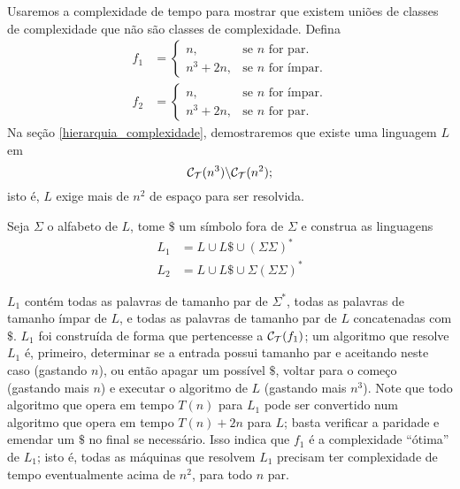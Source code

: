 \begin{counterexample}
    Usaremos a complexidade de tempo para mostrar que
    existem uniões de classes de complexidade
    que não são classes de complexidade.
    Defina
    \begin{align*}
        f_1 & = \begin{cases}
                    n, & \text{se $n$ for par.} \\
                    n^3 + 2n, & \text{se $n$ for ímpar.}
                \end{cases} \\
        f_2 & = \begin{cases}
                    n, & \text{se $n$ for ímpar.} \\
                    n^3 + 2n, & \text{se $n$ for par.}
                \end{cases}
    \end{align*}
    Na seção \ref{hierarquia_complexidade},
    demostraremos que existe uma linguagem $L$ em
    \begin{equation*}
        \mathcal C_{\mathcal{T}}(n^3) \backslash \mathcal C_{\mathcal{T}}(n^2);
    \end{equation*}
    isto é, $L$ exige mais de $n^2$ de espaço para ser resolvida.

    Seja $\Sigma$ o alfabeto de $L$,
    tome $\$$ um símbolo fora de $\Sigma$
    e construa as linguagens
    \begin{align*}
        L_1 &= L \cup L\$ \cup ( \Sigma \Sigma )^* \\
        L_2 &= L \cup L\$ \cup \Sigma ( \Sigma \Sigma )^*
    \end{align*}

    $L_1$ contém todas as palavras de tamanho par de $\Sigma^*$,
    todas as palavras de tamanho ímpar de $L$,
    e todas as palavras de tamanho par de $L$ concatenadas com $\$$.
    $L_1$ foi construída de forma que pertencesse
    a $\mathcal C_{\mathcal{T}}(f_1)$;
    um algoritmo que resolve $L_1$
    é, primeiro, determinar se a entrada possui tamanho par
    e aceitando neste caso
    (gastando $n$),
    ou então apagar um possível $\$$,
    voltar para o começo
    (gastando mais $n$)
    e executar o algoritmo de $L$
    (gastando mais $n^3$).
    Note que todo algoritmo que opera em tempo $T(n)$
    para $L_1$
    pode ser convertido num algoritmo que opera em tempo
    $T(n) + 2n$ para $L$;
    basta verificar a paridade e emendar um $\$$ no final
    se necessário.
    Isso indica que $f_1$ é a complexidade ``ótima''
    de $L_1$;
    isto é,
    todas as máquinas que resolvem $L_1$
    precisam ter complexidade de tempo
    eventualmente acima de $n^2$,
    para todo $n$ par.


\end{counterexample}
